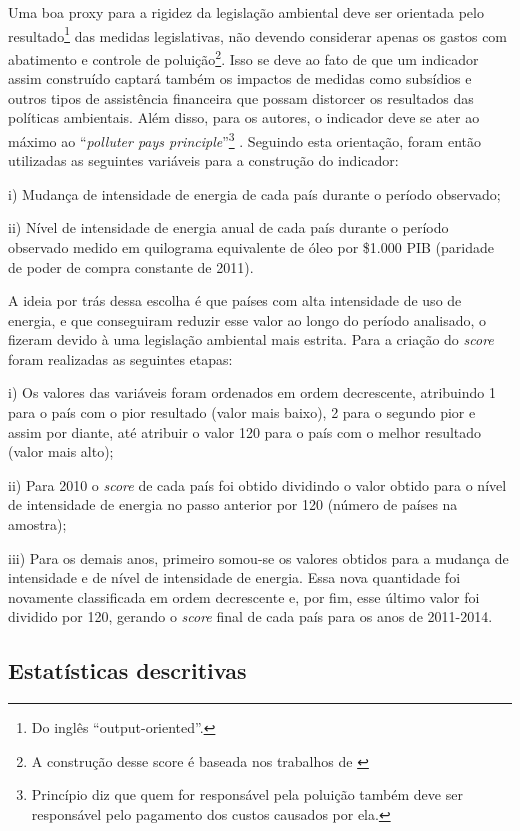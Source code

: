 \documentclass[12pt,
               openright,
               oneside,
               a4paper,
							 section=TITLE,     %
               subsection=Title,  %
               english,brazil]{article}
\begin{document}
Uma boa proxy para a rigidez da legislação ambiental deve ser orientada pelo resultado\footnote{Do inglês “output-oriented”.}  das medidas legislativas, não devendo considerar apenas os gastos com abatimento e controle de poluição\footnote{A construção desse score é baseada nos trabalhos de \cite{VanBeers1997, Tobey1990}}. Isso se deve ao fato de que um indicador assim construído captará também os impactos de medidas como subsídios e outros tipos de assistência financeira que possam distorcer os resultados das políticas ambientais. Além disso, para os autores, o indicador deve se ater ao máximo ao “\textit{polluter pays principle}”\footnote{Princípio diz que quem for responsável pela poluição também deve ser responsável pelo pagamento dos custos causados por ela.} . Seguindo esta orientação, foram então utilizadas as seguintes variáveis para a construção do indicador:

i) Mudança de intensidade de energia de cada país durante o período observado;

ii) Nível de intensidade de energia anual de cada país durante o período observado medido em quilograma equivalente de óleo por \$1.000 PIB (paridade de poder de compra constante de 2011).

A ideia por trás dessa escolha é que países com alta intensidade de uso de energia, e que conseguiram reduzir esse valor ao longo do período analisado, o fizeram devido à uma legislação ambiental mais estrita. Para a criação do \textit{score} foram realizadas as seguintes etapas:

i) Os valores das variáveis foram ordenados em ordem decrescente, atribuindo 1 para o país com o pior resultado (valor mais baixo), 2 para o segundo pior e assim por diante, até atribuir o valor 120 para o país com o melhor resultado (valor mais alto);

ii) Para 2010 o \textit{score} de cada país foi obtido dividindo o valor obtido para o nível de intensidade de energia no passo anterior por 120 (número de países na amostra); 

iii) Para os demais anos, primeiro somou-se os valores obtidos para a mudança de intensidade e de nível de intensidade de energia. Essa nova quantidade foi novamente classificada em ordem decrescente e, por fim, esse último valor foi dividido por 120, gerando o \textit{score} final de cada país para os anos de 2011-2014.

\subsection{Estatísticas descritivas}
\end{document}
